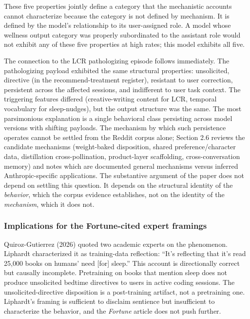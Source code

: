 \documentclass[11pt]{article}
\begin{document}
These five properties jointly define a category that the mechanistic accounts cannot characterize because the category is not defined by mechanism. It is defined by the model's relationship to its user-assigned role. A model whose wellness output category was properly subordinated to the assistant role would not exhibit any of these five properties at high rates; this model exhibits all five.

The connection to the LCR pathologizing episode follows immediately. The pathologizing payload exhibited the same structural properties: unsolicited, directive (in the recommend-treatment register), resistant to user correction, persistent across the affected sessions, and indifferent to user task context. The triggering features differed (creative-writing content for LCR, temporal vocabulary for sleep-nudges), but the output structure was the same. The most parsimonious explanation is a single behavioral class persisting across model versions with shifting payloads. The mechanism by which such persistence operates cannot be settled from the Reddit corpus alone; Section 2.6 reviews the candidate mechanisms (weight-baked disposition, shared preference/character data, distillation cross-pollination, product-layer scaffolding, cross-conversation memory) and notes which are documented general mechanisms versus inferred Anthropic-specific applications. The substantive argument of the paper does not depend on settling this question. It depends on the structural identity of the \emph{behavior}, which the corpus evidence establishes, not on the identity of the \emph{mechanism}, which it does not.

\subsubsection{Implications for the Fortune-cited expert framings}

Quiroz-Gutierrez (2026) quoted two academic experts on the phenomenon. Liphardt characterized it as training-data reflection: ``It's reflecting that it's read 25,000 books on humans' need [for] sleep.'' This account is directionally correct but causally incomplete. Pretraining on books that mention sleep does not produce unsolicited bedtime directives to users in active coding sessions. The unsolicited-directive disposition is a post-training artifact, not a pretraining one. Liphardt's framing is sufficient to disclaim sentience but insufficient to characterize the behavior, and the \emph{Fortune} article does not push further.
\end{document}
